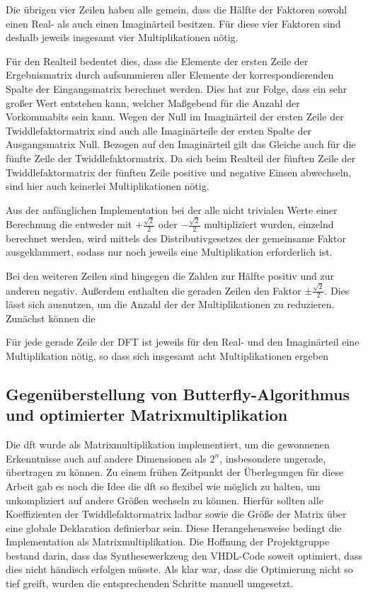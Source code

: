 Die übrigen vier Zeilen haben alle gemein, dass die Hälfte der Faktoren sowohl einen Real- als auch einen Imaginärteil besitzen. Für diese vier Faktoren sind deshalb
jeweils insgesamt vier Multiplikationen nötig.


Für den Realteil bedeutet dies, dass die Elemente der ersten Zeile der Ergebnismatrix durch aufsummieren aller Elemente der korrespondierenden Spalte der Eingangsmatrix 
berechnet werden. 
Dies hat zur Folge, dass ein sehr großer Wert entstehen kann, welcher Maßgebend für die Anzahl der Vorkommabits sein kann.
%
Wegen der Null im Imaginärteil der ersten Zeile der Twiddlefaktormatrix sind auch alle Imaginärteile der ersten Spalte der Ausgangsmatrix Null.
Bezogen auf den Imaginärteil gilt das Gleiche auch für die fünfte Zeile der Twiddlefaktormatrix. 
%
Da sich beim Realteil der fünften Zeile der Twiddlefaktormatrix der fünften Zeile positive und negative Einsen abwechseln, sind hier auch keinerlei Multiplikationen nötig.

Aus der anfänglichen Implementation bei der alle nicht trivialen Werte einer Berechnung die entweder mit $+\frac{\sqrt{2}}{2}$ oder $-\frac{\sqrt{2}}{2}$ multipliziert wurden,
einzelnd berechnet werden, wird mittels des Distributivgesetzes der gemeinsame Faktor ausgeklammert, sodass nur noch jeweils eine Multiplikation erforderlich ist.


Bei den weiteren Zeilen sind hingegen die Zahlen zur Hälfte positiv und zur anderen negativ. Außerdem enthalten die geraden Zeilen den Faktor $\pm\frac{\sqrt{2}}{2}$. 
Dies lässt sich ausnutzen, um die Anzahl der der Multiplikationen zu reduzieren. Zunächst können die 

Für jede gerade Zeile der DFT ist jeweils für den Real- und den Imaginärteil eine Multiplikation nötig, so dass sich insgesamt acht Multiplikationen ergeben







\subsection{Gegenüberstellung von Butterfly-Algorithmus und optimierter Matrixmultiplikation} 

Die \gls{dft} wurde als Matrixmultiplikation implementiert, um die gewonnenen Erkenntnisse auch auf andere Dimensionen als $2^n$, insbesondere ungerade, 
übertragen zu können.  
Zu einem frühen Zeitpunkt der Überlegungen für diese Arbeit gab es noch die Idee die \gls{dft} so flexibel wie möglich zu halten, um unkompliziert auf andere Größen wechseln zu können.
Hierfür sollten alle Koeffizienten der Twiddlefaktormatrix ladbar sowie die Größe der Matrix über eine globale Deklaration definierbar sein.
Diese Herangehensweise bedingt die Implementation als Matrixmultiplikation. Die Hoffnung der Projektgruppe bestand darin, dass das Synthesewerkzeug den 
VHDL-Code soweit optimiert, dass dies nicht händisch erfolgen müsste.
Als klar war, dass die Optimierung nicht so tief greift, wurden die entsprechenden Schritte manuell umgesetzt. 
  
